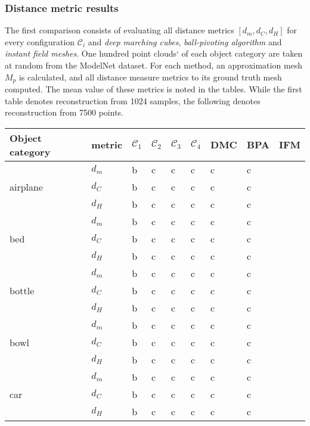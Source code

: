 \subsubsection*{Distance metric results}
    The first comparison consists of evaluating all distance metrics $[d_m, d_C, d_H]$ for every configuration
    $\mathcal{C}_i$ and \emph{deep marching cubes}, \emph{ball-pivoting algorithm} and \emph{instant field meshes}.
    One hundred point clouds` of each object category are taken at random from the ModelNet dataset. For each method,
    an approximation mesh $M_{p}$ is calculated, and all distance measure metrics to its ground truth mesh computed.
    The mean value of these metrics is noted in the tables. While the first table denotes reconstruction from 1024 
    samples, the following denotes reconstruction from 7500 points.
\begin{center}
     \label{tab:distance1024} 
    \begin{tabular}{| l | p{1.1cm} | p{0.8cm} | p{0.8cm} | p{0.8cm} | p{0.8cm} | p{0.9cm} | p{0.9cm} | p{0.9cm} |}
        \hline
        Object category& metric& $\mathcal{C}_1$ & $\mathcal{C}_2$ & $\mathcal{C}_3$ & $\mathcal{C}_4$ & DMC & BPA & IFM \\ \hline
        \multirow{3}{*}{airplane}&$d_m$&b&c&c&c&c&c&\\
        &$d_C$&b&c&c&c&c&c&\\
        &$d_H$&b&c&c&c&c&c&\\
        \hline
        \multirow{3}{*}{bed}&$d_m$&b&c&c&c&c&c&\\
        &$d_C$&b&c&c&c&c&c&\\
        &$d_H$&b&c&c&c&c&c&\\
        \hline
        \multirow{3}{*}{bottle}&$d_m$&b&c&c&c&c&c&\\
        &$d_C$&b&c&c&c&c&c&\\
        &$d_H$&b&c&c&c&c&c&\\
        \hline
        \multirow{3}{*}{bowl}&$d_m$&b&c&c&c&c&c&\\
        &$d_C$&b&c&c&c&c&c&\\
        &$d_H$&b&c&c&c&c&c&\\
        \hline
        \multirow{3}{*}{car}&$d_m$&b&c&c&c&c&c&\\
        &$d_C$&b&c&c&c&c&c&\\
        &$d_H$&b&c&c&c&c&c&\\

\end{tabular}
\end{center}
